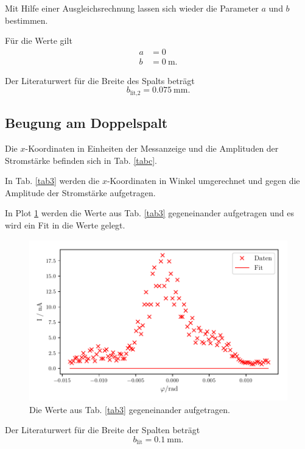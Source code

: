 \noindent Mit Hilfe einer Ausgleichsrechnung lassen sich wieder die Parameter $a$ und $b$ bestimmen. 

\noindent Für die Werte gilt %
\begin{align*}
    a &= \num{0} \\
    b &= \SI{0}{\meter}.
\end{align*}

\noindent Der Literaturwert für die Breite des Spalts beträgt
\begin{equation*}
    b_{\text{lit,2}} = \SI{0.075}{\milli\meter}.
\end{equation*}


\subsection{Beugung am Doppelspalt}
Die $x$-Koordinaten in Einheiten der Messanzeige und die Amplituden der Stromstärke befinden sich in Tab. \ref{tabc}. 



\noindent In Tab. \ref{tab3} werden die $x$-Koordinaten in Winkel umgerechnet und gegen die Amplitude der Stromstärke aufgetragen. 

%


\noindent In Plot \ref{fig:plot3} werden die Werte aus Tab. \ref{tab3} gegeneinander aufgetragen und es wird ein Fit in die Werte gelegt. 

\begin{figure}
    \centering
    \includegraphics[width=12cm, height=7cm]{build/plot3.pdf}
    \caption{Die Werte aus Tab. \ref{tab3} gegeneinander aufgetragen.}
    \label{fig:plot3}
\end{figure}

\noindent Der Literaturwert für die Breite der Spalten beträgt
\begin{equation*}
    b_{\text{lit}} = \SI{0.1}{\milli\meter}.
\end{equation*}

